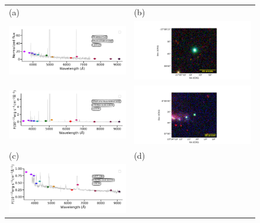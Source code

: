 \documentclass[fleqn,usenatbib]{mnras}
\begin{document}
{\begin{figure}
  \setlength\tabcolsep{0pt}
  \begin{tabular}{ll}
    (a) & (b) \\
    \includegraphics[trim=10 0 10 20, clip]{Figs/StenholmAcker_pn_g006_0-41_9_id176-SPLUS-s29s46-072842.pdf}
    & \includegraphics[width=0.4\linewidth, trim=10 0 10 20, clip]{Figs/PNG006_316-37_100_r.pdf} \\
    \includegraphics[trim=10 0 10 20, clip]{Figs/spec-0680-52200-0153-STRIPE82-0159-019049.pdf}
    & \includegraphics[width=0.4\linewidth, trim=10 0 10 20, clip]{Figs/GALEX24170_351-0_150_r.pdf} \\
    (c) & (d) \\
    \includegraphics[trim=10 0 10 20, clip]{Figs/spec-0376-52143-0631-STRIPE82-0142-027354.pdf}

\end{tabular}
\end{figure}}
\end{document}
